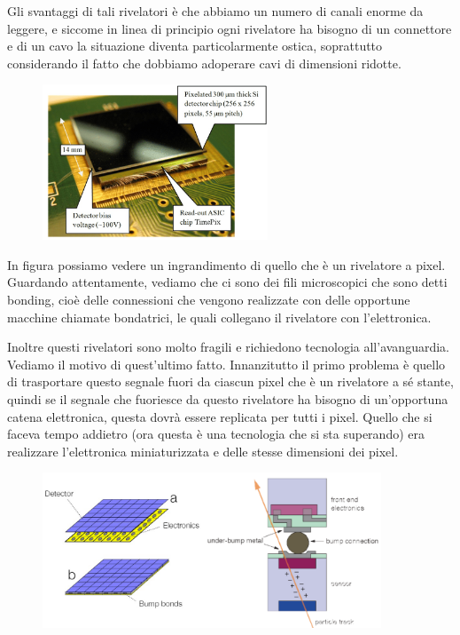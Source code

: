Gli svantaggi di tali rivelatori è che abbiamo un numero di canali enorme da leggere, e siccome in linea di principio ogni rivelatore ha bisogno di un connettore e di un cavo la situazione diventa particolarmente ostica, soprattutto considerando il fatto che dobbiamo adoperare cavi di dimensioni ridotte.
\begin{figure}[H]
   \centering
   \includegraphics[width=0.6\textwidth]{immagini/zoom_rivelatore_silicio.png}
\end{figure}
In figura possiamo vedere un ingrandimento di quello che è un rivelatore a pixel. Guardando attentamente, vediamo che ci sono dei fili microscopici che sono detti bonding, cioè delle connessioni che vengono realizzate con delle opportune macchine chiamate bondatrici, le quali collegano il rivelatore con l'elettronica.

Inoltre questi rivelatori sono molto fragili e richiedono tecnologia all'avanguardia. Vediamo il motivo di quest'ultimo fatto. Innanzitutto il primo problema è quello di trasportare questo segnale fuori da ciascun pixel che è un rivelatore a sé stante, quindi se il segnale che fuoriesce da questo rivelatore ha bisogno di un'opportuna catena elettronica, questa dovrà essere replicata per tutti i pixel. Quello che si faceva tempo addietro (ora questa è una tecnologia che si sta superando) era realizzare l'elettronica miniaturizzata e delle stesse dimensioni dei pixel.

\begin{figure}[H]
   \centering
   \includegraphics[width=0.9\textwidth]{immagini/connessione_rivelatore_a_pixel.png}
\end{figure}

